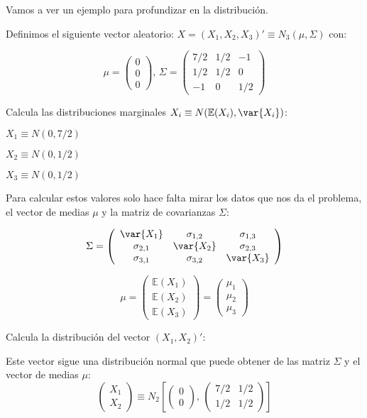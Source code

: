 Vamos a ver un ejemplo para profundizar en la distribución.
\begin{example}
Definimos el siguiente vector aleatorio: $X = (X_1,X_2,X_3)' \equiv N_3(\mu, \Sigma)$ con:

\[
\mu=
\left(
\begin{array}{c}
0\\
0\\
0
\end{array}
\right) \text{,       }
\Sigma=
\left(
\begin{array}{ccc}
7/2& 1/2& -1 \\
1/2& 1/2& 0 \\
-1& 0& 1/2
\end{array}
\right)
\]

\ppart Calcula las distribuciones marginales $X_i \equiv N(\mathbb{E}(X_i), \var{X_i})$:

$X_1\equiv N(0, 7/2)$

$X_2\equiv N(0, 1/2)$

$X_3\equiv N(0, 1/2)$

Para calcular estos valores solo hace falta mirar los datos que nos da el problema, el vector de medias $\mu$ y la matriz de covarianzas $\Sigma$:

\[
\Sigma=\left(
\begin{array}{ccc}
\var{X_1}& \sigma_{1,2}& \sigma_{1,3} \\
\sigma_{2,1}& \var{X_2}& \sigma_{2,3} \\
\sigma_{3,1}& \sigma_{3,2}& \var{X_3}
\end{array}
\right)
\]

\[
\mu=
\left(
\begin{array}{c}
\mathbb{E}(X_1)\\
\mathbb{E}(X_2)\\
\mathbb{E}(X_3)
\end{array}
\right)=
\left(
\begin{array}{c}
\mu_1\\
\mu_2\\
\mu_3
\end{array}
\right)
\]

\ppart Calcula la distribución del vector $(X_1,X_2)'$:

Este vector sigue una distribución normal que puede obtener de las matriz $\Sigma$ y el vector de medias $\mu$:
\[
\left(
\begin{array}{c}
X_1\\
X_2
\end{array}
\right)
\equiv N_2\left[
\left(
\begin{array}{c}
0\\
0
\end{array}
\right)
\text{, }
\left(
\begin{array}{cc}
7/2& 1/2 \\
1/2 & 1/2
\end{array}
\right)
\right]
\]


\end{example}
